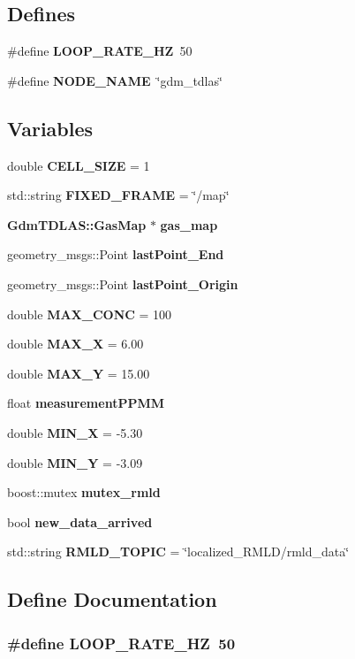 \subsection*{Defines}
\begin{DoxyCompactItemize}
\item 
\#define {\bf LOOP\_\-RATE\_\-HZ}~50
\item 
\#define {\bf NODE\_\-NAME}~\char`\"{}gdm\_\-tdlas\char`\"{}
\end{DoxyCompactItemize}
\subsection*{Variables}
\begin{DoxyCompactItemize}
\item 
double {\bf CELL\_\-SIZE} = 1
\item 
std::string {\bf FIXED\_\-FRAME} = \char`\"{}/map\char`\"{}
\item 
{\bf GdmTDLAS::GasMap} $\ast$ {\bf gas\_\-map}
\item 
geometry\_\-msgs::Point {\bf lastPoint\_\-End}
\item 
geometry\_\-msgs::Point {\bf lastPoint\_\-Origin}
\item 
double {\bf MAX\_\-CONC} = 100
\item 
double {\bf MAX\_\-X} = 6.00
\item 
double {\bf MAX\_\-Y} = 15.00
\item 
float {\bf measurementPPMM}
\item 
double {\bf MIN\_\-X} = -\/5.30
\item 
double {\bf MIN\_\-Y} = -\/3.09
\item 
boost::mutex {\bf mutex\_\-rmld}
\item 
bool {\bf new\_\-data\_\-arrived}
\item 
std::string {\bf RMLD\_\-TOPIC} = \char`\"{}localized\_\-RMLD/rmld\_\-data\char`\"{}
\end{DoxyCompactItemize}


\subsection{Define Documentation}
\subsubsection[{LOOP\_\-RATE\_\-HZ}]{\setlength{\rightskip}{0pt plus 5cm}\#define LOOP\_\-RATE\_\-HZ~50}\label{gdm__tdlas_8h_acd97b33c4ed6a53a3c744ea2f76bd378}


